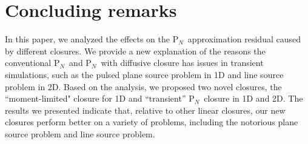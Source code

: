 \documentclass[review]{elsarticle}
\newcommand{\pn}{P$_N$}
\newcommand{\dn}{D$_N$}
\begin{document}
\section{Concluding remarks}
In this paper, we analyzed the effects on the \pn~approximation residual caused by different closures. We provide a new explanation of the reasons the conventional \pn~and \pn~with diffusive closure has issues in transient simulations, such as the pulsed plane source problem {in 1D and line source problem in 2D}. Based on the analysis, we proposed two novel closures, the ``moment-limited" closure for 1D and ``transient'' \pn\ closure in 1D and 2D. The results we presented indicate that, relative to other linear closures, our new closures perform better on a variety of problems, including the notorious plane source problem {and line source problem}. 

{
}

{
}
\end{document}
